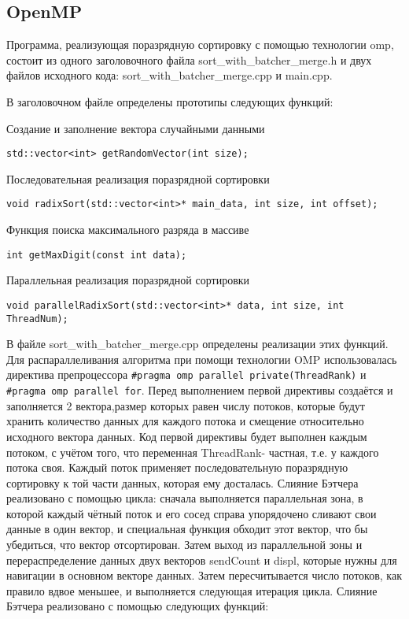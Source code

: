 \documentclass{report}
\begin{document}
\subsection*{OpenMP}
\par Программа, реализующая поразрядную сортировку с помощью технологии omp, состоит из одного заголовочного файла sort\_with\_batcher\_merge.h и двух файлов исходного кода: sort\_with\_batcher\_merge.cpp и main.cpp.
\par В заголовочном файле определены прототипы следующих функций:
\par Создание и заполнение вектора случайными данными \par
\begin{lstlisting}
std::vector<int> getRandomVector(int size);
\end{lstlisting}
\par Последовательная реализация поразрядной сортировки \par
\begin{lstlisting}
void radixSort(std::vector<int>* main_data, int size, int offset);
\end{lstlisting}
\par Функция поиска максимального разряда в массиве \par
\begin{lstlisting}
int getMaxDigit(const int data);
\end{lstlisting}
\par Параллельная реализация поразрядной сортировки \par
\begin{lstlisting}
void parallelRadixSort(std::vector<int>* data, int size, int ThreadNum);
\end{lstlisting}
\par В файле  sort\_with\_batcher\_merge.cpp определены реализации этих функций. Для распараллеливания алгоритма при помощи технологии OMP использовалась директива препроцессора \verb|#pragma omp parallel private(ThreadRank)| и \verb|#pragma omp parallel for|. Перед выполнением первой директивы создаётся и заполняется 2 вектора,размер которых равен числу потоков, которые будут хранить количество данных для каждого потока и смещение относительно исходного вектора данных. Код первой директивы будет выполнен каждым потоком, с учётом того, что переменная ThreadRank- частная, т.е. у каждого потока своя. Каждый поток применяет последовательную поразрядную сортировку к той части данных, которая ему досталась. Слияние Бэтчера реализовано с помощью цикла: сначала выполняется параллельная зона, в которой каждый чётный поток и его сосед справа упорядочено сливают свои данные в один вектор, и специальная функция обходит этот вектор, что бы убедиться, что вектор отсортирован. Затем выход из параллельной зоны и перераспределение данных двух векторов sendCount и displ, которые нужны для навигации в основном векторе данных. Затем пересчитывается число потоков, как правило вдвое меньшее, и выполняется следующая итерация цикла. Слияние Бэтчера реализовано с помощью следующих функций:
\end{document}
